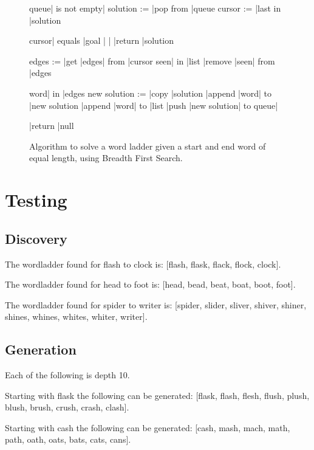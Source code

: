 \documentclass[11pt]{article} %
\begin{document}
\begin{figure}[h!!]
\caption{Algorithm to solve a word ladder given a start and end word of equal length, using Breadth First Search.}
\begin{program}
\BEGIN
\WHILE queue| is not empty|\DO
	solution := |pop from |queue 
	cursor := |last in |solution

	\IF cursor| equals |goal | |\THEN
		|return |solution 
	\FI
	
	edges := |get |edges| from |cursor
	\FOR seen| in |list \DO
		|remove |seen| from |edges 
	\OD

	\FOR word| in |edges \DO
		new solution := |copy |solution 
		|append |word| to |new solution
		|append |word| to |list 
		|push |new solution| to queue| 
	\OD

	|return |null 
\OD
\END
\end{program}
\label{fig:DiscoverAlgorithm}
\end{figure}


\section{Testing}
\subsection{Discovery}
The wordladder found for flash to clock is: [flash, flask, flack, flock, clock].

The wordladder found for head to foot is: [head, bead, beat, boat, boot, foot].

The wordladder found for spider to writer is: [spider, slider, sliver, shiver, shiner, shines, whines, whites, whiter, writer].

\subsection{Generation}
Each of the following is depth 10.

Starting with flask the following can be generated: [flask, flash, flesh, flush, plush, blush, brush, crush, crash, clash].

Starting with cash the following can be generated: [cash, mash, mach, math, path, oath, oats, bats, cats, cans].
\end{document}
